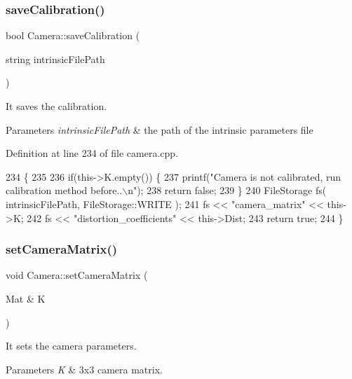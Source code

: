 \subsubsection{\texorpdfstring{save\+Calibration()}{saveCalibration()}}
{\footnotesize\ttfamily bool Camera\+::save\+Calibration (\begin{DoxyParamCaption}\item[{string}]{intrinsic\+File\+Path }\end{DoxyParamCaption})}



It saves the calibration. 


\begin{DoxyParams}{Parameters}
{\em intrinsic\+File\+Path} & the path of the intrinsic parameters file \\
\hline
\end{DoxyParams}


Definition at line 234 of file camera.\+cpp.


\begin{DoxyCode}
234                                                      \{
235   
236     \textcolor{keywordflow}{if}(this->K.empty()) \{
237         printf(\textcolor{stringliteral}{"Camera is not calibrated, run calibration method before..\(\backslash\)n"});
238         \textcolor{keywordflow}{return} \textcolor{keyword}{false};
239     \}
240    FileStorage fs( intrinsicFilePath, FileStorage::WRITE );
241     fs << \textcolor{stringliteral}{"camera\_matrix"} << this->K;
242     fs << \textcolor{stringliteral}{"distortion\_coefficients"} << this->Dist;
243    \textcolor{keywordflow}{return} \textcolor{keyword}{true};
244 \}
\end{DoxyCode}
\mbox{\label{classCamera_ab1d197f991bc02d373d8833f7da2e7eb}} 
\subsubsection{\texorpdfstring{set\+Camera\+Matrix()}{setCameraMatrix()}}
{\footnotesize\ttfamily void Camera\+::set\+Camera\+Matrix (\begin{DoxyParamCaption}\item[{Mat \&}]{K }\end{DoxyParamCaption})}



It sets the camera parameters. 


\begin{DoxyParams}{Parameters}
{\em K} & 3x3 camera matrix. \\
\hline
\end{DoxyParams}



